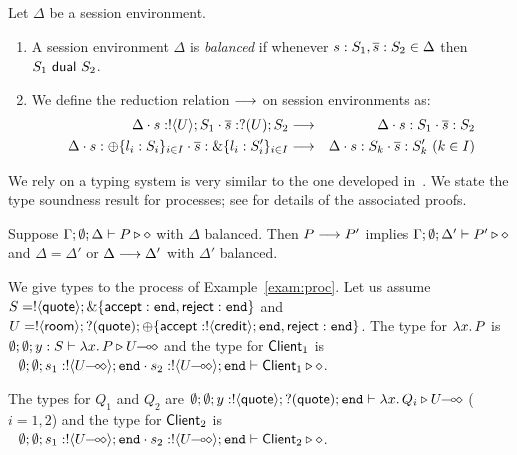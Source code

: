 
\begin{definition}\label{d:wtenvred}%
	Let $\Delta$ be a session environment.
	\begin{enumerate}[$\bullet$]
	\item A session environment $\Delta$ is {\em balanced} if whenever
	$s: S_1, \overline{s}: S_2 \in \Delta$ then $S_1 \ \mathsf{dual}\  S_2$.
	\item We define the reduction relation $\longrightarrow$ on session environments as: %
\begin{eqnarray*}
	\Delta \cat s: \btout{U} S_1 \cat \dual{s}: \btinp{U} S_2  & \red & 
	\Delta \cat s: S_1 \cat \dual{s}: S_2  \\
	\Delta \cat s: \btsel{l_i: S_i}_{i \in I} \cat \dual{s}: \btbra{l_i: S_i'}_{i \in I} &\red& \Delta \cat s: S_k \cat \dual{s}: S_k' \ (k \in I)
\end{eqnarray*}
\end{enumerate}
\end{definition}

\noi We rely on a typing system is very similar to the one developed in~\cite{tlca07,MostrousY15}. 
We state the type soundness result for \HOp processes;
see  for details of the associated proofs.


\begin{theorem}\label{t:sr}%
			Suppose $\Gamma; \emptyset; \Delta \vdash P \triangleright \diamond$
			with
			$\Delta$ balanced. 
			Then $P \longrightarrow P'$ implies $\Gamma; \emptyset; \Delta'  \vdash P' \triangleright \diamond$
			and $\Delta = \Delta'$ or $\Delta \longrightarrow \Delta'$
			with $\Delta'$ balanced. 
\end{theorem}


\begin{example}\label{exam:type}
We give types to the process of Example~\ref{exam:proc}.
Let us assume $S = ! \langle \mathsf{quote} \rangle ; \& \{\mathsf{accept}: \mathtt{end}, \mathsf{reject}: \mathtt{end}\}$ and
$U = ! \langle \mathsf{room} \rangle ; ? (\mathsf{quote}) ; \oplus \{\mathsf{accept}: ! \langle \mathsf{credit} \rangle ; \mathtt{end}, \mathsf{reject}: \mathtt{end} \}$.
The type for $\lambda x.\,P$ is $\emptyset; \emptyset; y: S \vdash \lambda x.\,P \triangleright U\!\! \multimap\!\! \diamond$
and the type for $\mathsf{Client}_1$ is
$~~
	\es; \es; s_1: \btout{\lhot{U}} \tinact \cat s_2: \btout{\lhot{U}} \tinact \proves \Client_1 \hastype \Proc
$.
%

The types for $Q_1$ and $Q_2$ are
%
$	\emptyset; \emptyset; y: ! \langle \mathsf{quote} \rangle ; ? (\mathsf{quote}) ; \mathtt{end} \vdash \lambda x.\,Q_i \triangleright U\!\! \multimap\!\! \diamond
$ ($i=1,2$)
%
and the type for $\mathsf{Client}_2$ is
$~~
	\es; \es; s_1: \btout{\lhot{U}} \tinact \cat s_2: \btout{\lhot{U}} \tinact \proves \Client_2 \hastype \Proc
$.
%
\end{example}

